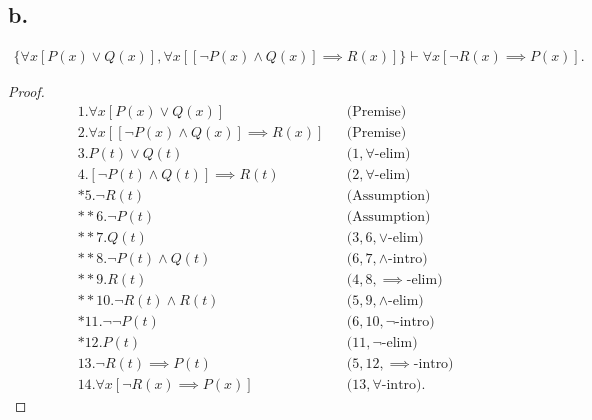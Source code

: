 \documentclass{article}
\begin{document}
\subsection*{b.}
\begin{align*}
  \{ 
  \forall x \left[ P(x) \lor Q(x) \right],
  \forall x \left[ \left[ \lnot P(x) \land Q(x) \right] \implies R(x) \right] \}
  \vdash
  \forall x \left[\lnot R(x) \implies P(x) \right].
\end{align*}
\begin{proof}
  \begin{align*}
    &1. \forall x \left[ P(x) \lor Q(x) \right] &&\text{(Premise)} \\
    &2. \forall x \left[ \left[ \lnot P(x) \land Q(x) \right] \implies R(x) \right] &&\text{(Premise)} \\
    &3. P(t) \lor Q(t) &&\text{($1, \forall$-elim)} \\
    &4. \left[ \lnot P(t) \land Q(t) \right] \implies R(t) &&\text{($2, \forall$-elim)} \\
    &*5. \lnot R(t) &&\text{(Assumption)} \\
    &**6. \lnot P(t) &&\text{(Assumption)} \\
    &**7. Q(t) &&\text{($3, 6, \lor$-elim)} \\
    &**8. \lnot P(t) \land Q(t) &&\text{($6, 7, \land$-intro)} \\
    &**9. R(t) &&\text{($4, 8, \implies$-elim)} \\
    &**10. \lnot R(t) \land R(t) &&\text{($5, 9, \land$-elim)} \\
    &*11. \lnot \lnot P(t) &&\text{($6, 10, \lnot$-intro)} \\
    &*12. P(t) &&\text{($11, \lnot$-elim)} \\
    &13. \lnot R(t) \implies P(t) &&\text{($5, 12, \implies$-intro)} \\
    &14. \forall x \left[ \lnot R(x) \implies P(x) \right] &&\text{($13, \forall$-intro)}.
  \end{align*}
\end{proof}

\newpage
\end{document}

